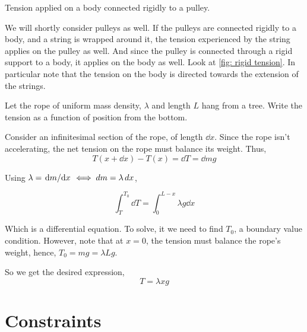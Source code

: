 \begin{marginfigure}
    \caption{Tension applied on a body connected rigidly to a pulley.}
    \label{fig: rigid tension}
\end{marginfigure}

We will shortly consider pulleys as well. If the pulleys are connected rigidly to 
a body, and a string is wrapped around it, the tension experienced by the string applies on the 
pulley as well. And since the pulley is connected through a rigid support to a body, 
it applies on the body as well. Look at \cref{fig: rigid tension}. In particular note that 
the tension on the body is directed towards the extension of the strings.

\begin{example}
    Let the rope of uniform mass density, \(\lambda\) and length \(L\) hang from a tree. Write the tension as 
    a function of position from the bottom. 
    \begin{soln}
        Consider an infinitesimal section of the rope, of length \(\dd{x}\). Since 
        the rope isn't accelerating, the net tension on the rope must balance its weight.
        Thus,
        \begin{equation*}
            T(x + \dd{x}) - T(x) = \dd{T} = \dd{m} g
        \end{equation*}

        Using \(\lambda = \dv*{m}{x} \iff \mathop{}\!{d}{m} = \lambda \mathop{}\!{d}{x}\),

        \begin{equation*}
            \int_{T}^{T_0} \dd{T} = \int_0^{L-x} \lambda g \dd{x}
        \end{equation*}

        Which is a differential equation. To solve, it we need to find \(T_0\), 
        a boundary value condition. However, note that at \(x = 0\), 
        the tension must balance the rope's weight, hence, \(T_0 = mg = \lambda Lg\).

        So we get the desired expression, \begin{equation*}
            T = \lambda xg
        \end{equation*}
    \end{soln}
\end{example}

\section{Constraints}

